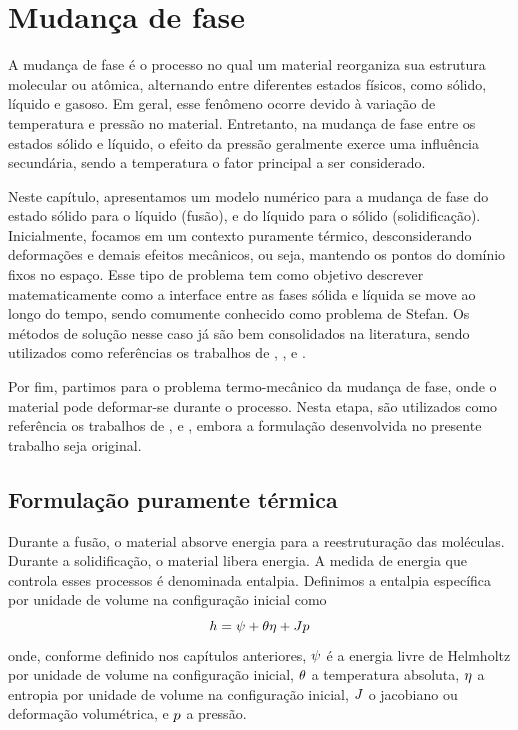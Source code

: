 \documentclass[Tese.tex]{subfiles}
\begin{document}
	
\chapter{Mudança de fase}\label{ch:mudanca-de-fase}

A mudança de fase é o processo no qual um material reorganiza sua estrutura molecular ou atômica, alternando entre diferentes estados físicos, como sólido, líquido e gasoso. Em geral, esse fenômeno ocorre devido à variação de temperatura e pressão no material. Entretanto, na mudança de fase entre os estados sólido e líquido, o efeito da pressão geralmente exerce uma influência secundária, sendo a temperatura o fator principal a ser considerado.

Neste capítulo, apresentamos um modelo numérico para a mudança de fase do estado sólido para o líquido (fusão), e do líquido para o sólido (solidificação). Inicialmente, focamos em um contexto puramente térmico, desconsiderando deformações e demais efeitos mecânicos, ou seja, mantendo os pontos do domínio fixos no espaço. Esse tipo de problema tem como objetivo descrever matematicamente como a interface entre as fases sólida e líquida se move ao longo do tempo, sendo comumente conhecido como problema de Stefan. Os métodos de solução nesse caso já são bem consolidados na literatura, sendo utilizados como referências os trabalhos de , ,  e . 

Por fim, partimos para o problema termo-mecânico da mudança de fase, onde o material pode deformar-se durante o processo. Nesta etapa, são utilizados como referência os trabalhos de ,  e , embora a formulação desenvolvida no presente trabalho seja original.

\section{Formulação puramente térmica}\label{sec:mudanca-de-fase-termica}

Durante a fusão, o material absorve energia para a reestruturação das moléculas. Durante a solidificação, o material libera energia. A medida de energia que controla esses processos é denominada entalpia. Definimos a entalpia específica por unidade de volume na configuração inicial como
\begin{equation}
h = \psi + \theta\eta + Jp
\end{equation}
onde, conforme definido nos capítulos anteriores, $\psi$ é a energia livre de Helmholtz por unidade de volume na configuração inicial, $\theta$ a temperatura absoluta, $\eta$ a entropia por unidade de volume na configuração inicial, $J$ o jacobiano ou deformação volumétrica, e $p$ a pressão.
\end{document}
